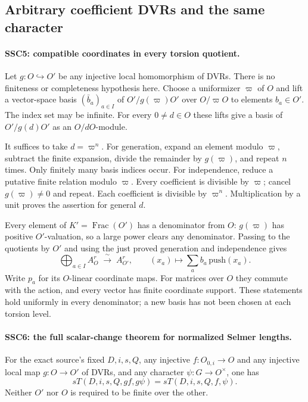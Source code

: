 \subsection{Arbitrary coefficient DVRs and the same character}

\paragraph{SSC5: compatible coordinates in every torsion quotient.}
\label{claim:SSC5}
Let $g:O\hookrightarrow O'$ be any injective local homomorphism
of DVRs. There is no finiteness or completeness hypothesis here.
Choose a uniformizer $\varpi$ of $O$ and lift a vector-space basis
$(\bar b_a)_{a\in I}$ of $O'/g(\varpi)O'$ over $O/\varpi O$
to elements $b_a\in O'$. The index set may be infinite. For every
$0\ne d\in O$ these lifts give a basis of $O'/g(d)O'$ as an
$O/dO$-module.

It suffices to take $d=\varpi^n$. For generation, expand an
element modulo $\varpi$, subtract the finite expansion, divide
the remainder by $g(\varpi)$, and repeat $n$ times. Only finitely
many basis indices occur. For independence, reduce a putative
finite relation modulo $\varpi$. Every coefficient is divisible
by $\varpi$; cancel $g(\varpi)\ne0$ and repeat. Each coefficient
is divisible by $\varpi^n$. Multiplication by a unit proves the
assertion for general $d$.

Every element of $K'=\operatorname{Frac}(O')$ has a denominator
from $O$: $g(\varpi)$ has positive $O'$-valuation, so a large
power clears any denominator. Passing to the quotients by $O'$
and using the just proved generation and independence gives
\[
 \bigoplus_{a\in I} A_O^r \;\xrightarrow{\ \sim\ }\; A_{O'}^r,
 \qquad (x_a)\longmapsto\sum_a b_a\,\mathrm{push}(x_a).        \tag{SSC.9}
\]
Write $p_a$ for its $O$-linear coordinate maps. For matrices over
$O$ they commute with the action, and every vector has finite
coordinate support. These statements hold uniformly in every
denominator; a new basis has not been chosen at each torsion level.

\paragraph{SSC6: the full scalar-change theorem for normalized Selmer lengths.}
\label{claim:SSC6}
For the exact source's fixed $D,i,s,Q$, any injective
$f:O_{0,i}\to O$ and any injective local map $g:O\to O'$ of
DVRs, and any character $\psi:G\to O^\times$, one has
\[
 sT(D,i,s,Q,gf,g\psi)=sT(D,i,s,Q,f,\psi).                     \tag{SSC.10}
\]
Neither $O'$ nor $O$ is required to be finite over the other.

